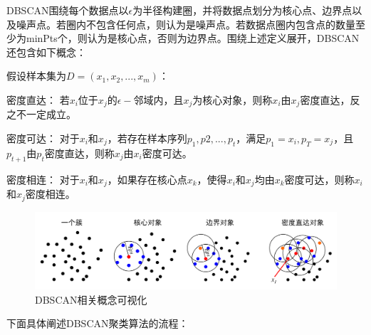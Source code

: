 DBSCAN围绕每个数据点以$\epsilon$为半径构建圈，并将数据点划分为核心点、边界点以及噪声点。若圈内不包含任何点，则认为是噪声点。若数据点圈内包含点的数量至少为minPts个，则认为是核心点，否则为边界点。围绕上述定义展开，DBSCAN还包含如下概念：

假设样本集为$D=(x_1,x_2,...,x_m)$：
\begin{compactitem}
	\item 密度直达： 若$ x_i $位于$ x_j $的$ \epsilon- $邻域内，且$ x_j $为核心对象，则称$ x_i $由$ x_j $密度直达，反之不一定成立。
	\item 密度可达： 对于$ x_i $和$ x_j $，若存在样本序列$ p_1,p2,...,p_t $，满足$ p_1=x_i,p_T=x_j $，且$ p_{t+1} $由$ p_t $密度直达，则称$ x_j $由$ x_i $密度可达。
	\item 密度相连： 对于$ x_i $和$ x_j $，如果存在核心点$ x_k $，使得$ x_i $和$ x_j $均由$ x_k $密度可达，则称$ x_i $和$ x_j $密度相连。
\end{compactitem}

\begin{figure}[htbp] %
	\centering
	\includegraphics[scale=0.18 ]{img/dbscan-pre.png}
	\caption{DBSCAN相关概念可视化}
	\label{s4-dbscanpre}
\end{figure}

下面具体阐述DBSCAN聚类算法的流程：

